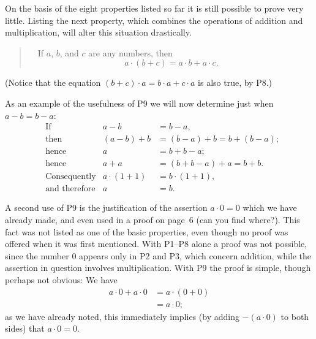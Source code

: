 On the basis of the eight properties listed so far it is still possible to
prove very little. Listing the next property, which combines the operations
of addition and multiplication, will alter this situation drastically.

\begin{quote}
\ \ If $a$, $b$, and $c$ are any numbers, then
\[ a \cdot (b + c) = a \cdot b + a \cdot c. \]
\end{quote}

(Notice that the equation $(b+c) \cdot a = b \cdot a + c \cdot a$ is also
true, by P8.)

As an example of the usefulness of P9 we will now determine just when
$a-b = b-a$:
\begin{align*}
&\text{If} & a - b &= b - a,\\
&\text{then} & (a-b)+b &= (b-a)+b = b+(b-a);\\
&\text{hence} & a &= b + b - a;\\
&\text{hence} & a + a &= (b+b-a)+a = b+b.\\
&\text{Consequently} & a \cdot (1+1) &= b \cdot (1+1),\\
&\text{and therefore} & a &= b.
\end{align*}

A second use of P9 is the justification of the assertion $a \cdot 0 = 0$
which we have already made, and even used in a proof on page~6 (can you find
where?). This fact was not listed as one of the basic properties, even though
no proof was offered when it was first mentioned. With P1--P8 alone a proof
was not possible, since the number $0$ appears only in P2 and P3, which
concern addition, while the assertion in question involves multiplication.
With P9 the proof is simple, though perhaps not obvious: We have
\begin{align*}
a \cdot 0 + a \cdot 0 &= a \cdot (0 + 0)\\
&= a \cdot 0;
\end{align*}
as we have already noted, this immediately implies (by adding $-(a \cdot 0)$
to both sides) that $a \cdot 0 = 0$.

